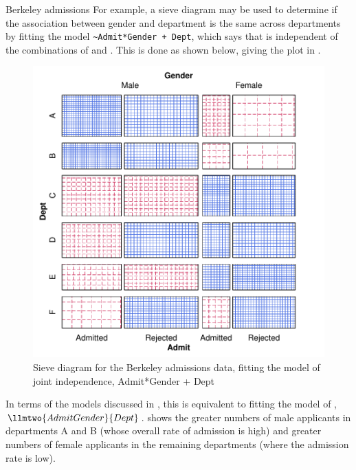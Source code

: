 \documentclass[11pt]{book}
\renewenvironment{knitrout}{\small\renewcommand{\baselinestretch}{.85}}{} %
\begin{document}
\begin{Example}[berkeley3]{Berkeley admissions}
For example, a sieve diagram may be used to determine if the association
between gender and department is the same across departments
by fitting the model \verb|~Admit*Gender + Dept|, which
says that  is independent of the combinations of 
and .  This is done as shown below, giving the plot in
.

\begin{knitrout}
\color{fgcolor}\begin{kframe}
\begin{alltt}
 \hlkwb{<-}  \hlstd{(}\hlstd{,}\hlstd{,}\hlstd{))}
 \hlstd{=}\hlstd{,} \hlstd{=}\hlopt{~}\hlopt{*} \hlopt{+} 
      \hlstd{=}\hlstd{(}\hlstd{,}\hlstd{,}\hlstd{))}
\end{alltt}
\end{kframe}\begin{figure}[!htbp]


\centerline{\includegraphics[width=.6\textwidth]{ch04/fig/berkeley-sieve2} }

\caption[Sieve diagram for the Berkeley admissions data, fitting the model of joint independence, Admit*Gender + Dept]{Sieve diagram for the Berkeley admissions data, fitting the model of joint independence, Admit*Gender + Dept\label{fig:berkeley-sieve2}}
\end{figure}


\end{knitrout}
In terms of the \loglin models discussed in
, this is equivalent to fitting the model
of , $\llmtwo{AdmitGender}{Dept}$.
 shows the greater numbers of
male applicants in departments A and B
(whose overall rate of admission is high) and greater numbers of female
applicants in the remaining departments (where the admission rate is low).

\end{Example}
\end{document}
